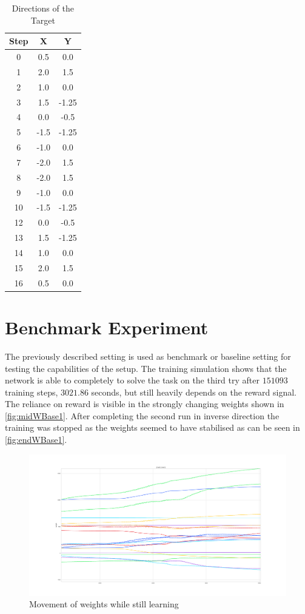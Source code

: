 \begin{table}[htpb]
  \caption[Ball Directions]{Directions of the Target} \label{tab:ballMove}
  \centering
  \begin{tabular}{|c| c |c|}
      \toprule
      Step & X & Y  \\
      \midrule
        0 &  0.5 & 0.0 \\
        1 &  2.0 & 1.5 \\
        2 &  1.0 & 0.0 \\
        3 &  1.5 & -1.25 \\
        4 &  0.0 & -0.5 \\
        5 &  -1.5 & -1.25 \\
        6 &  -1.0 & 0.0 \\
        7 &  -2.0 & 1.5 \\
        8 &  -2.0 & 1.5 \\
        9 &  -1.0 & 0.0 \\
        10 &  -1.5 & -1.25 \\
        12 &  0.0 & -0.5 \\
        13 &  1.5 & -1.25 \\
        14 &  1.0 & 0.0 \\
        15 &  2.0 & 1.5 \\
        16 &  0.5 & 0.0 \\ 
      \bottomrule
  \end{tabular}
\end{table}

\section{Benchmark Experiment}
The previously described setting is used as benchmark or baseline setting for testing the capabilities of the setup. 
The training simulation shows that the network is able to completely to solve the task on the third try after $151093$ training steps, $3021.86$ seconds, but still heavily depends on the reward signal. The reliance on reward is visible in the strongly changing weights shown in \autoref{fig:midWBase1}. After completing the second run in inverse direction the training was stopped as the weights seemed to have stabilised as can be seen in \autoref{fig:endWBase1}.

\begin{figure}[htpb]
  \centering
  \includegraphics[width=\textwidth]{figures/plots/midWBase1}
  \caption{Movement of weights while still learning }
  \label{fig:midWBase1}
\end{figure}


